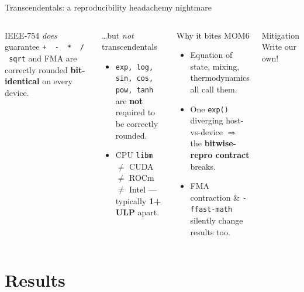 \documentclass[aspectratio=169]{beamer}
\begin{document}
\begin{frame}[fragile]{Transcendentals: a reproducibility headache}{my nightmare}
  \begin{columns}[T,onlytextwidth]
      \begin{block}{IEEE-754 \emph{does} guarantee}
        \texttt{+ \ - \ * \ / \ sqrt} and FMA are correctly rounded \textbf{bit-identical} on every device.
      \end{block}
      \begin{alertblock}{\dots but \emph{not} transcendentals}
        \begin{itemize}
          \item \texttt{exp, log, sin, cos, pow, tanh} are \textbf{not} required to be correctly rounded.
          \item CPU \texttt{libm} $\neq$ CUDA $\neq$ ROCm $\neq$ Intel --- typically \textbf{1+ ULP} apart.
        \end{itemize}
      \end{alertblock}
      \begin{block}{Why it bites MOM6}
        \begin{itemize}
          \item Equation of state, mixing, thermodynamics all call them.
          \item One \texttt{exp()} diverging host-vs-device $\Rightarrow$ the \textbf{bitwise-repro contract} breaks.
          \item FMA contraction \& \texttt{-ffast-math} silently change results too.
        \end{itemize}
      \end{block}
      \begin{exampleblock}{Mitigation}
        Write our own! 
      \end{exampleblock}
  \end{columns}
\end{frame}
  
\section{Results}
\end{document}
